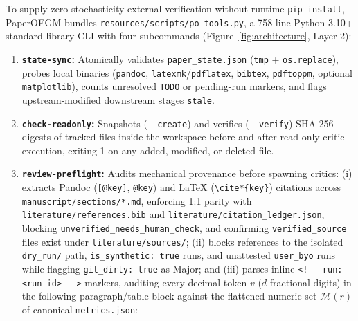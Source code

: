 To supply zero-stochasticity external verification \citep{huang2024selfcorrect} without runtime \texttt{pip\ install}, PaperOEGM bundles \texttt{resources/\allowbreak{}scripts/\allowbreak{}po\_\allowbreak{}tools.\allowbreak{}py}, a 758-line Python 3.10+ standard-library CLI with four subcommands (Figure~\ref{fig:architecture}, Layer 2):

\begin{enumerate}
\def\labelenumi{\arabic{enumi}.}
\tightlist
\item
  \textbf{\texttt{state-sync}:} Atomically validates \texttt{paper\_\allowbreak{}state.\allowbreak{}json} (\texttt{tmp} + \texttt{os.\allowbreak{}replace}), probes local binaries (\texttt{pandoc}, \texttt{latexmk}/\allowbreak{}\texttt{pdflatex}, \texttt{bibtex}, \texttt{pdftoppm}, optional \texttt{matplotlib}), counts unresolved \texttt{TODO} or pending-run markers, and flags upstream-modified downstream stages \texttt{stale}.
\item
  \textbf{\texttt{check-readonly}:} Snapshots (\texttt{\mbox{-{}-}create}) and verifies (\texttt{\mbox{-{}-}verify}) SHA-256 digests of tracked files inside the workspace before and after read-only critic execution, exiting 1 on any added, modified, or deleted file.
\item
  \textbf{\texttt{review-preflight}:} Audits mechanical provenance before spawning critics: (i) extracts Pandoc (\texttt{{[}@key{]}}, \texttt{@key}) and LaTeX (\texttt{\textbackslash{}cite*\{key\}}) citations across \texttt{manuscript/\allowbreak{}sections/\allowbreak{}*.md}, enforcing 1:1 parity with \texttt{literature/\allowbreak{}references.\allowbreak{}bib} and \texttt{literature/\allowbreak{}citation\_\allowbreak{}ledger.\allowbreak{}json}, blocking \texttt{unverified\_\allowbreak{}needs\_\allowbreak{}human\_\allowbreak{}check}, and confirming \texttt{verified\_\allowbreak{}source} files exist under \texttt{literature/\allowbreak{}sources/}; (ii) blocks references to the isolated \texttt{dry\_\allowbreak{}run/} path, \texttt{is\_\allowbreak{}synthetic:\ true} runs, and unattested \texttt{user\_\allowbreak{}byo} runs while flagging \texttt{git\_\allowbreak{}dirty:\ true} as Major; and (iii) parses inline \texttt{\textless{}!\mbox{-{}-}\ run:\textless{}run\_\allowbreak{}id\textgreater{}\ \mbox{-{}-}\textgreater{}} markers, auditing every decimal token \(v\) (\(d\) fractional digits) in the following paragraph/table block against the flattened numeric set \(\mathcal{M}(r)\) of canonical \texttt{metrics.\allowbreak{}json}:


\end{enumerate}
